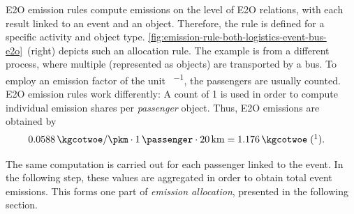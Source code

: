 E2O emission rules compute emissions on the level of E2O relations, with each result linked to an event and an object.
Therefore, the rule is defined for a specific activity and object type.
\autoref{fig:emission-rule-both-logistics-event-bus-e2o}~(right)
depicts such an allocation rule.
The example is from a different process, where multiple  (represented as objects) are transported by a bus.
To employ an emission factor of the unit \unit{\kgcotwoe\per\pkm}, the passengers are usually counted. E2O emission rules work differently: A count of 1 is used in order to compute individual emission shares per \textit{passenger} object.
Thus, E2O emissions are obtained by
\begin{align*}
	\qty{0.0588}{\kgcotwoe\per\pkm} \cdot \qty{1}{\passenger} \cdot \qty{20}{\km} &= \qty{1.176}{\kgcotwoe}
  \;(\footnotemark).
\end{align*}
\nopagebreak
{}

The same computation is carried out for each passenger linked to the  event.
In the following step, these values are aggregated in order to obtain total event emissions.
This forms one part of \textit{emission allocation}, presented in the following section.
